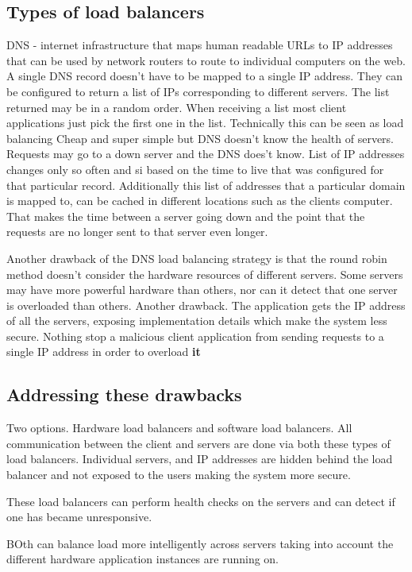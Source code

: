 \subsection{Types of load balancers}
DNS - internet infrastructure that maps human readable URLs to IP addresses that can be used by network routers to route to individual computers on the web.
A single DNS record doesn't have to be mapped to a single IP address.
They can be configured to return a list of IPs corresponding to different servers.
The list returned may be in a random order.
When receiving a list most client applications just pick the first one in the list.
Technically this can be seen as load balancing
Cheap and super simple but DNS doesn't know the health of servers.
Requests may go to a down server and the DNS does't know.
List of IP addresses changes only so often and si based on the time to live that was configured for that particular record.
Additionally this list of addresses that a particular domain is mapped to, can be cached in different locations such as the clients computer.
That makes the time between a server going down and the point that the requests are no longer sent to that server even longer.

Another drawback of the DNS load balancing strategy is that the round robin method doesn't consider the hardware resources of different servers.
Some servers may have more powerful hardware than others, nor can it detect that one server is overloaded than others.
Another drawback.
The application gets the IP address of all the servers, exposing implementation details which make the system less secure.
Nothing stop a malicious client application from sending requests to a single IP address in order to overload \textbf{it}

\subsection{Addressing these drawbacks}
Two options.
Hardware load balancers and software load balancers.
All communication between the client and servers are done via both these types of load balancers.
Individual servers, and IP addresses are hidden behind the load balancer and not exposed to the users making the system more secure.

These load balancers can perform health checks on the servers and can detect if one has became unresponsive.

BOth can balance load more intelligently across servers taking into account the different hardware application instances are running on.

